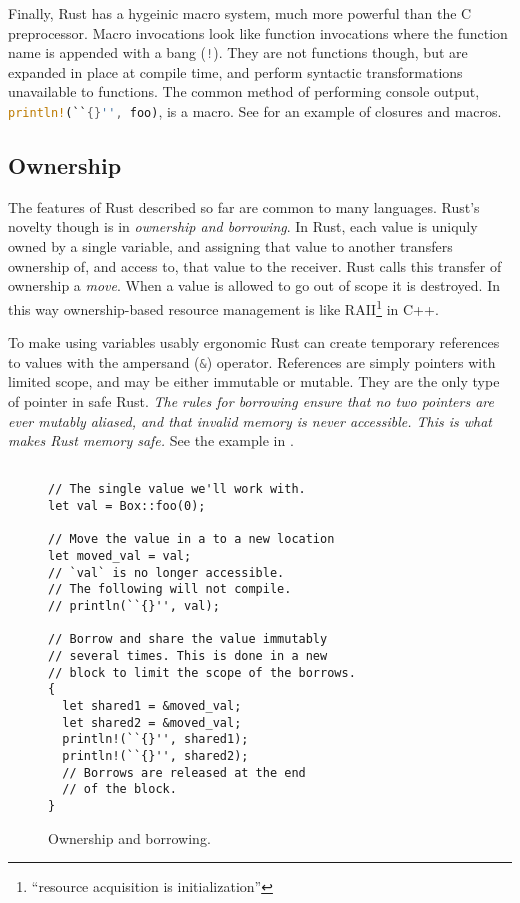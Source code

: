 Finally, Rust has a hygeinic macro system, much more powerful than
the C preprocessor. Macro invocations look like function invocations
where the function name is appended with a bang (\lstinline[language=Rust]{!}).
They are not functions though, but are expanded in place at compile time,
and perform syntactic transformations unavailable to functions.
The common method of performing console output, \lstinline[language=Rust]~println!(``{}'', foo)~,
is a macro.
See  for an example of closures and macros.

\subsection{Ownership}
The features of Rust described so far are common to many languages.
Rust's novelty though is in \emph{ownership and borrowing}.
In Rust, each value is uniquly owned by a single variable, and
assigning that value to another transfers ownership of, and access to,
that value to the receiver. Rust calls this transfer of ownership a \emph{move}.
When a value is allowed to go out of scope
it is destroyed. In this way ownership-based resource management is
like RAII\footnote{``resource acquisition is initialization''} in C++.

To make using variables usably ergonomic Rust can create temporary
references to values with the ampersand (\lstinline[language=Rust]{&})
operator. References are simply pointers with limited scope, and may be either
immutable or mutable. They are the only type of pointer in safe Rust.
\emph{The rules for borrowing ensure that no two pointers are ever mutably
aliased, and that invalid memory is never accessible.
This is what makes Rust memory safe.} See the example in .

\begin{figure}
\begin{lstlisting}

// The single value we'll work with.
let val = Box::foo(0);

// Move the value in a to a new location
let moved_val = val;
// `val` is no longer accessible.
// The following will not compile.
// println(``{}'', val);

// Borrow and share the value immutably
// several times. This is done in a new
// block to limit the scope of the borrows.
{
  let shared1 = &moved_val;
  let shared2 = &moved_val;
  println!(``{}'', shared1);
  println!(``{}'', shared2);
  // Borrows are released at the end
  // of the block.
}
\end{lstlisting}
  \caption{Ownership and borrowing.}
  \label{fig:own}
\end{figure}


